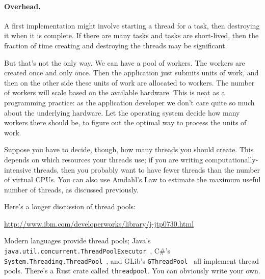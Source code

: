 \paragraph{Overhead.}
A first implementation might involve starting a thread for a task, then destroying it when it is complete. If there are many tasks and tasks are short-lived, then the fraction of time creating and destroying the threads may be significant.

 But that's not the only way. We can have a pool of workers. The workers are created once and only once. Then the application just submits units of work, and then on the other side these units of work are allocated to workers. The number of workers will scale based on the available hardware. This is neat as a programming practice: as the application developer we don't care quite so much about the underlying hardware. Let the operating system decide how many workers there should be, to figure out the optimal way to process the units of work.
 
Suppose you have to decide, though, how many threads you should create.
This depends
on which resources your threads use; if you are writing
computationally-intensive threads, then you probably want to have
fewer threads than the number of virtual CPUs. You can also use
Amdahl's Law to estimate the maximum useful number of threads, as
discussed previously.

Here's a longer discussion of thread pools:

\begin{center}
\url{http://www.ibm.com/developerworks/library/j-jtp0730.html}
\end{center}

Modern languages provide thread pools; Java's
\texttt{java.util.concurrent.ThreadPoolExecutor}~\cite{java:threadpoolexecutor}, C\#'s
\texttt{System.Threading.ThreadPool}~\cite{csharp:threadpool}, and GLib's {\tt GThreadPool}~\cite{gnome:threadpool} all implement thread pools. There's a Rust crate called \texttt{threadpool}. You can obviously write your own.

